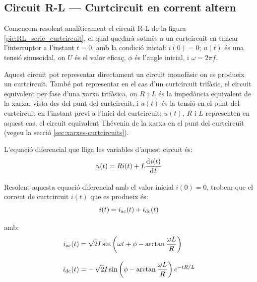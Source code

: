 \subsection {Circuit R-L --- Curtcircuit en corrent altern}\label{sec:ccRL}

Comencem resolent analíticament el circuit R-L de la figura \vref{pic:RL_serie_curtcircuit}, el qual quedarà sotmès a un curtcircuit en tancar l'interruptor a l'instant $t=0$, amb la condició inicial: $i(0) = 0$; $u(t)$ és una tensió sinusoidal, on $U$ és el valor eficaç, $\phi$ és l'angle inicial, i $\omega = 2 \pi f$.

Aquest circuit pot representar directament un circuit monofàsic on es produeix un curtcircuit. També pot representar en el cas d'un curtcircuit trifàsic,  el circuit equivalent per fase d'una xarxa trifàsica, on $R$ i $L$ és la impedància equivalent de la xarxa, vista des del punt del curtcircuit, i $u(t)$ és la tensió en el punt del curtcircuit en l'instant previ a l'inici del curtcircuit; $u(t)$,  $R$ i $L$ representen en aquest cas, el circuit equivalent Thévenin de la xarxa en el punt del curtcircuit (vegeu la secció \ref{sec:xarxes-curtcircuits}).

\begin{center}
    
    \label{pic:RL_serie_curtcircuit}
\end{center}

L'equació diferencial que lliga les variables d'aquest circuit és:
\begin{equation}
    u(t) = R i(t) + L \deriv{i(t)}{t}
\end{equation}

Resolent aquesta equació diferencial amb el valor inicial $i(0)=0$, trobem que el corrent de curtcircuit $i(t)$  que es produeix  és:
\begin{equation}
    i(t) = i_\mathrm{ac}(t) + i_\mathrm{dc}(t)
    \label{eq:RL_serie_curtcircuit_icc}
\end{equation}

amb:
\begin{subequations}
\begin{align}
    i_\mathrm{ac}(t) &= \sqrt{2} I \sin\left(\omega t + \phi - \arctan\frac{\omega L}{R}\right) \label{eq:RL_serie_curtcircuit_iac}\\[3mm]
    i_\mathrm{dc}(t) &= -\,\sqrt{2} I\sin\left(\phi - \arctan\frac{\omega L}{R}\right) e^{-t R/L}\label{eq:RL_serie_curtcircuit_idc}
\end{align}
\end{subequations}

